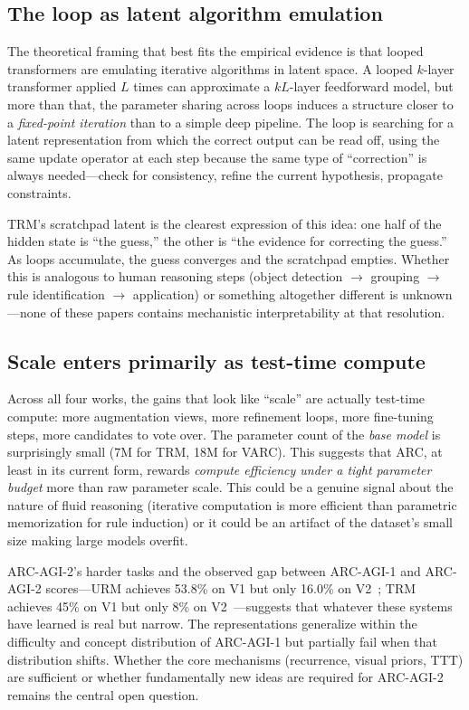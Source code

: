 \documentclass[11pt, letterpaper]{article}
\begin{document}
\subsection{The loop as latent algorithm emulation}

The theoretical framing that best fits the empirical evidence is that looped
transformers are emulating iterative algorithms in latent space. A looped
$k$-layer transformer applied $L$ times can approximate a $kL$-layer
feedforward model, but more than that, the parameter sharing across loops
induces a structure closer to a \emph{fixed-point iteration} than to a
simple deep pipeline. The loop is searching for a latent representation from
which the correct output can be read off, using the same update operator at
each step because the same type of ``correction'' is always needed---check
for consistency, refine the current hypothesis, propagate constraints.

TRM's scratchpad latent is the clearest expression of this idea: one half of
the hidden state is ``the guess,'' the other is ``the evidence for correcting
the guess.'' As loops accumulate, the guess converges and the scratchpad
empties. Whether this is analogous to human reasoning steps (object
detection $\to$ grouping $\to$ rule identification $\to$ application) or
something altogether different is unknown---none of these papers contains
mechanistic interpretability at that resolution.

\subsection{Scale enters primarily as test-time compute}

Across all four works, the gains that look like ``scale'' are actually
test-time compute: more augmentation views, more refinement loops, more
fine-tuning steps, more candidates to vote over. The parameter count of the
\emph{base model} is surprisingly small (7M for TRM, 18M for VARC). This
suggests that ARC, at least in its current form, rewards \emph{compute
efficiency under a tight parameter budget} more than raw parameter scale.
This could be a genuine signal about the nature of fluid reasoning (iterative
computation is more efficient than parametric memorization for rule
induction) or it could be an artifact of the dataset's small size making
large models overfit.

ARC-AGI-2's harder tasks and the observed gap between ARC-AGI-1 and
ARC-AGI-2 scores---URM achieves 53.8\% on V1 but only 16.0\% on
V2~\cite{gao2025urm}; TRM achieves 45\% on V1 but only 8\% on
V2~\cite{jolicoeur2025trm}---suggests that whatever these systems have
learned is real but narrow. The representations generalize within the
difficulty and concept distribution of ARC-AGI-1 but partially fail
when that distribution shifts. Whether the core mechanisms (recurrence,
visual priors, TTT) are sufficient or whether fundamentally new ideas
are required for ARC-AGI-2 remains the central open question.
\end{document}
